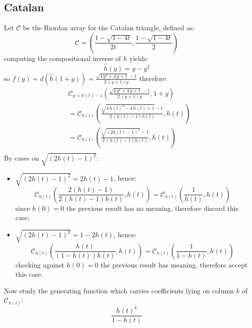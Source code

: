 \documentclass[11pt,a4paper]{article} %
\begin{document}
    \subsection{Catalan}
    Let $\mathcal{C}$ be the Riordan array for the Catalan triangle,
    defined as:
    \begin{displaymath} 
        \mathcal{C} = \left(\frac{1-\sqrt{1-4t}}{2t}, \frac{1-\sqrt{1-4t}}{2}  \right)
    \end{displaymath} 
    computing the compositional inverse of $h$ yields:
    \begin{displaymath} 
        \hat{h}(y) = y - y^2
    \end{displaymath} 
    so $f(y)=d(\hat{h}(1+y))=\frac{\sqrt{4 \, y^{2} + 4 \, y + 1} - 1}{2 \, {\left(y + 1\right)} y}$ therefore:
    \begin{displaymath} 
        \begin{split} 
            &\mathcal{C}_{y=h(t)-1}\left(\frac{\sqrt{4 \, y^{2} + 4 \, y + 1} - 1}{2 \, {\left(y + 1\right)} y}, 1+y \right) \\
            &= \mathcal{C}_{h(t)}\left(\frac{\sqrt{4 \, h\left(t\right)^{2} - 4 \, h\left(t\right) + 1} - 1}{2 \, {\left(h\left(t\right) - 1\right)} h\left(t\right)}, h(t) \right)\\
            &= \mathcal{C}_{h(t)}\left(\frac{\sqrt{(2 h\left(t\right) -  1)^2} - 1}{2 \, {\left(h\left(t\right) - 1\right)} h\left(t\right)}, h(t) \right)\\
        \end{split} 
    \end{displaymath} 
    By cases on $\sqrt{(2 h\left(t\right) -  1)^2}$:
    \begin{itemize}
        \item $\sqrt{(2 h\left(t\right) -  1)^2}=2 h\left(t\right) -  1$, hence:
            \begin{displaymath} 
                \mathcal{C}_{h(t)}\left(\frac{2(h\left(t\right) -  1)}{2 \, {\left(h\left(t\right) - 1\right)} h\left(t\right)}, h(t) \right)=
                \mathcal{C}_{h(t)}\left(\frac{1}{h\left(t\right)}, h(t) \right)
            \end{displaymath} 
            since $h(0)=0$ the previous result has no meaning, therefore discard this case;
        \item $\sqrt{(2 h\left(t\right) -  1)^2}=1 -2 h\left(t\right)$, hence:
            \begin{displaymath} 
                \mathcal{C}_{h(t)}\left(\frac{h\left(t\right)}{ {\left(1-h\left(t\right) \right)} h\left(t\right)}, h(t) \right)=
                \mathcal{C}_{h(t)}\left(\frac{1}{1-h\left(t\right)}, h(t) \right)
            \end{displaymath} 
            checking against $h(0)=0$ the previous result has meaning, therefore accept this case.
    \end{itemize}
    Now study the generating function which carries coefficients lying on column $k$
    of $\mathcal{C}_{h(t)}$:
    \begin{displaymath} 
        \frac{h(t)^{k}}{1-h\left(t\right)} 
    \end{displaymath} 
\end{document}
